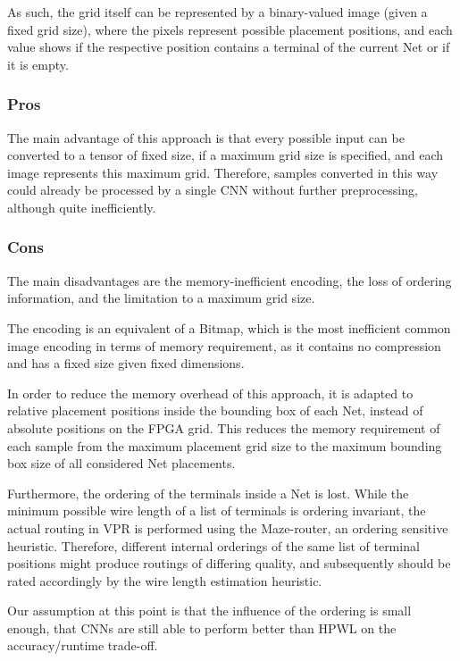 As such, the grid itself can be represented by a binary-valued image (given a fixed grid size), where the pixels represent possible placement positions, and each value shows if the respective position contains a terminal of the current Net or if it is empty.

\subsubsection{Pros}

The main advantage of this approach is that every possible input can be converted to a tensor of fixed size, if a maximum grid size is specified, and each image represents this maximum grid. Therefore, samples converted in this way could already be processed by a single \gls{CNN} without further preprocessing, although quite inefficiently.

\subsubsection{Cons}

The main disadvantages are the memory-inefficient encoding, the loss of ordering information, and the limitation to a maximum grid size.

The encoding is an equivalent of a Bitmap, which is the most inefficient common image encoding in terms of memory requirement, as it contains no compression and has a fixed size given fixed dimensions.

In order to reduce the memory overhead of this approach, it is adapted to relative placement positions inside the bounding box of each Net, instead of absolute positions on the \gls{FPGA} grid. This reduces the memory requirement of each sample from the maximum placement grid size to the maximum bounding box size of all considered Net placements.

Furthermore, the ordering of the terminals inside a Net is lost. While the minimum possible wire length of a list of terminals is ordering invariant, the actual routing in \gls{VPR} is performed using the Maze-router, an ordering sensitive heuristic. Therefore, different internal orderings of the same list of terminal positions might produce routings of differing quality, and subsequently should be rated accordingly by the wire length estimation heuristic.

Our assumption at this point is that the influence of the ordering is small enough, that \glspl{CNN} are still able to perform better than \gls{HPWL} on the accuracy/runtime trade-off.

